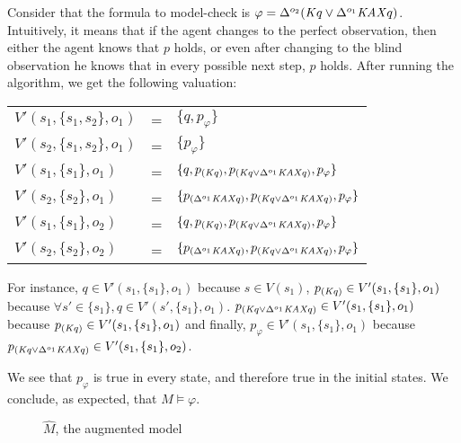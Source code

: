 Consider that the formula to model-check is $\varphi=\Delta^{o_2}(\mathit{K} q\vee\Delta^{o_1}\mathit{K}\mathit{A}\mathit{X} q)$.
Intuitively, it means that if the agent changes to the perfect observation, then either the agent knows that $p$ holds, or even after changing to the blind observation he knows that in every possible next step, $p$ holds.
After running the algorithm, we get the following valuation:

\begin{tabular}{l c l}
$V'(s_1,\{s_1,s_2\},o_1)$ &=& $\{q,p_\varphi\}$\\
$V'(s_2,\{s_1,s_2\},o_1)$ &=& $\{p_\varphi \}$\\
$V'(s_1,\{s_1\},o_1)$ &=& $\{q,p_{(\mathit{K} q)},p_{(\mathit{K} q\vee\Delta^{o_1}\mathit{K}\mathit{A}\mathit{X} q)},p_\varphi\}$\\
$V'(s_2,\{s_2\},o_1)$ &=& $\{p_{(\Delta^{o_1}\mathit{K}\mathit{A}\mathit{X} q)},p_{(\mathit{K} q\vee\Delta^{o_1}\mathit{K}\mathit{A}\mathit{X} q)},p_\varphi\}$\\
$V'(s_1,\{s_1\},o_2)$ &=& $\{q,p_{(\mathit{K} q)},p_{(\mathit{K} q\vee\Delta^{o_1}\mathit{K}\mathit{A}\mathit{X} q)},p_\varphi\}$\\
$V'(s_2,\{s_2\},o_2)$ &=& $\{p_{(\Delta^{o_1}\mathit{K}\mathit{A}\mathit{X} q)},p_{(\mathit{K} q\vee\Delta^{o_1}\mathit{K}\mathit{A}\mathit{X} q)},p_\varphi\}$\\
\end{tabular}

For instance, $q\in V'(s_1,\{s_1\},o_1)$ because $s\in V(s_1)$, $p_{(\mathit{K} q)}\in V'(s_1,\{s_1\},o_1)$ because $\forall s'\in\{s_1\}, q\in V'(s',\{s_1\},o_1)$.
$p_{(\mathit{K} q\vee\Delta^{o_1}\mathit{K}\mathit{A}\mathit{X} q)}\in V'(s_1,\{s_1\},o_1)$ because $p_{(\mathit{K} q)}\in V'(s_1,\{s_1\},o_1)$ and finally, $p_\varphi\in V'(s_1,\{s_1\},o_1)$ because $p_{(\mathit{K} q\vee\Delta^{o_1}\mathit{K}\mathit{A}\mathit{X} q)}\in V'(s_1,\{s_1\},o_2)$.

We see that $p_\varphi$ is true in every state, and therefore true in the initial states. We conclude, as expected, that $M\models\varphi$.

\begin{figure}
  \centering
    \caption{$\hat{M}$, the augmented model}
    \label{fig:hatm}
\end{figure}
